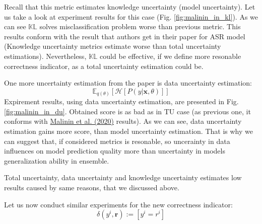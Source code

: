 \documentclass[a4paper,14pt]{extarticle}
\newcommand{\bibref}[3]{\hyperlink{#1}{#2 (#3)}}
\begin{document}
	Recall that this metric estimates knowledge uncertainty (model uncertainty). Let us take a look at experiment results for this case (Fig. \ref{fig:malinin_in_kl}). As we can see $\mathbb{KL}$ solves misclassification problem worse than previous metric. This results conform with the result that authors get in their paper for ASR model (Knowledge uncertainty metrics estimate worse than total uncertainty estimations). Nevertheless, $\mathbb{KL}$ could be effective, if we define more resonable correctness indicator, as a total uncertainty estimation could be. 
	
	One more uncertainty estimation from the paper is data uncertainty estimation:
	\begin{equation*}
		\mathbb{E}_{q(\theta)}[\mathcal{H}[P(y| \textbf{x}, \theta)]]
	\end{equation*}
	Expirement results, using data uncertainty estimation, are presented in Fig. \ref{fig:malinin_in_du}. Obtained score is as bad as in TU case (as previous one, it conforms with \bibref{uncertainty}{Malinin et al.} {2020} results). As we can see, data uncertainty estimation gains more score, than model uncertainty estimation. That is why we can suggest that, if considered metrics is resonable, so uncerainty in data influences on model prediction quality more than uncertainty in models generalization ability in ensemble.
	
	Total uncertainty, data uncertainty and knowledge uncertainty estimates low results caused by same reasons, that we discussed above.
	
	Let us now conduct similar experiments for the new correctness indicator:
	\begin{equation}
		\delta(y^i, \textbf{r}) := [y^i = r^i]
	\end{equation}
	
\end{document}
